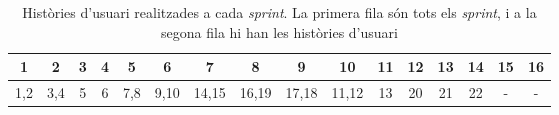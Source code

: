 

    
\begin{table}[h]
    \begin{center}
    \begin{tabular}{ |c|c|c|c|c|c|c|c|c|c|c|c|c|c|c|c| }
             \hline
1    &    2	&	3	&	4	&	5	&	6	&	7	&	8	&	9	&	10	&	11	&	12	&	13	&	14	&	15	&	16
 \\ \hline
1,2	&	3,4	&	5	&	6	&	7,8	&	9,10	&	14,15	&	16,19	&	17,18	&	11,12	&	13	&	20	&	21	&	22	&	-	&	-
            \\ \hline
    \end{tabular}
    \end{center}
    \caption{ Històries d'usuari realitzades a cada \textit{sprint}. La primera fila són tots els \textit{sprint}, i a la segona fila hi han les històries d'usuari \label{historesPerSprint}}
\end{table}

